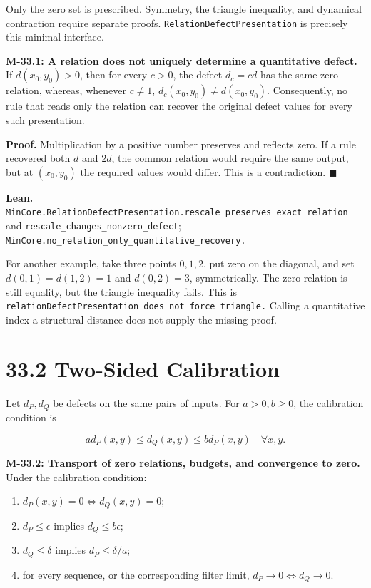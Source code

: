 \documentclass[
  english,
  11pt,
  oneside]{book}
\providecommand{\tightlist}{%
  \setlength{\itemsep}{0pt}\setlength{\parskip}{0pt}}
\begin{document}
Only the zero set is prescribed. Symmetry, the triangle inequality, and dynamical contraction require separate proofs. \nolinkurl{RelationDefectPresentation} is precisely this minimal interface.

\hypertarget{m-33-1}{}\label{m-33-1}

\textbf{M-33.1: A relation does not uniquely determine a quantitative defect.} If \(d(x_0,y_0)>0\), then for every \(c>0\), the defect \(d_c=cd\) has the same zero relation, whereas, whenever \(c\ne1\), \(d_c(x_0,y_0)\ne d(x_0,y_0)\). Consequently, no rule that reads only the relation can recover the original defect values for every such presentation.

\textbf{Proof.} Multiplication by a positive number preserves and reflects zero. If a rule recovered both \(d\) and \(2d\), the common relation would require the same output, but at \((x_0,y_0)\) the required values would differ. This is a contradiction. \(\blacksquare\)

\textbf{Lean.} \nolinkurl{MinCore.RelationDefectPresentation.rescale_preserves_exact_relation} and \nolinkurl{rescale_changes_nonzero_defect}; \nolinkurl{MinCore.no_relation_only_quantitative_recovery.}

For another example, take three points \(0,1,2\), put zero on the diagonal, and set \(d(0,1)=d(1,2)=1\) and \(d(0,2)=3\), symmetrically. The zero relation is still equality, but the triangle inequality fails. This is \nolinkurl{relationDefectPresentation_does_not_force_triangle.} Calling a quantitative index a structural distance does not supply the missing proof.

\section{33.2 Two-Sided Calibration}\label{two-sided-calibration}

Let \(d_P,d_Q\) be defects on the same pairs of inputs. For \(a>0,b\ge0\), the calibration condition is

\[a d_P(x,y)\le d_Q(x,y)\le b d_P(x,y)\quad\forall x,y.\]

\hypertarget{m-33-2}{}\label{m-33-2}

\textbf{M-33.2: Transport of zero relations, budgets, and convergence to zero.} Under the calibration condition:

\begin{enumerate}
\def\labelenumi{\arabic{enumi}.}
\tightlist
\item
  \(d_P(x,y)=0\iff d_Q(x,y)=0\);
\item
  \(d_P\le\epsilon\) implies \(d_Q\le b\epsilon\);
\item
  \(d_Q\le\delta\) implies \(d_P\le\delta/a\);
\item
  for every sequence, or the corresponding filter limit, \(d_P\to0\iff d_Q\to0\).
\end{enumerate}
\end{document}
